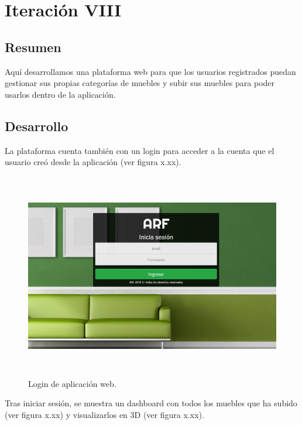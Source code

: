 \section{Iteración VIII}
\subsection{Resumen}
Aquí desarrollamos una plataforma web para que los usuarios registrados puedan gestionar sus propias categorías de muebles y subir sus muebles para poder usarlos dentro de la aplicación.

\subsection{Desarrollo}
La plataforma cuenta también con un login para acceder a la cuenta que el usuario creó desde la aplicación (ver figura x.xx).

\begin{figure}[hbt!]
	\centering
	\includegraphics[width=15cm,height=9cm]{imagenes/desarrollo/app/WEB_LOGIN.png}
	\caption{Login de aplicación web.}
	\label{fig:weblogin}
\end{figure}

Tras iniciar sesión, se muestra un dashboard con todos los muebles que ha subido (ver figura x.xx) y visualizarlos en 3D (ver figura x.xx).

